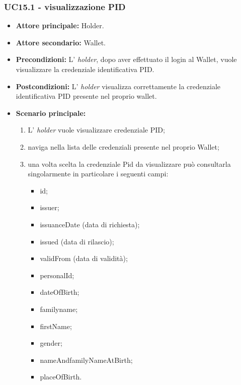 \subsubsection{UC15.1 - visualizzazione PID}
\begin{itemize}
\item \textbf{Attore principale:} Holder.
\item \textbf{Attore secondario:} Wallet. 
\item \textbf{Precondizioni:} L’ \textit{holder}, dopo aver effettuato il login al Wallet, vuole visualizzare la credenziale identificativa PID.
\item \textbf{Postcondizioni:} L’ \textit{holder} visualizza correttamente la credenziale identificativa PID presente nel proprio wallet.
\item \textbf{Scenario principale:} 
    \begin{enumerate}
        \item L' \textit{holder} vuole visualizzare credenziale PID; 
        \item naviga nella lista delle credenziali presente nel proprio Wallet;
        \item una volta scelta la credenziale Pid da visualizzare può consultarla singolarmente in particolare i seguenti campi:
        \begin{itemize}
            \item id;
            \item issuer;
            \item issuanceDate (data di richiesta);
            \item issued (data di rilascio);
            \item validFrom (data di validità);
            \item personalId;
            \item dateOfBirth;
            \item familyname;
            \item firstName;
            \item gender;
            \item nameAndfamilyNameAtBirth;
            \item placeOfBirth.
        \end{itemize}
    \end{enumerate}
\end{itemize}

